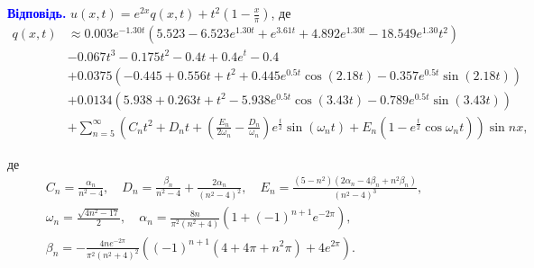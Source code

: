 \documentclass{hw_template}
\begin{document}
\textcolor{blue}{\textbf{Відповідь.}} $u(x,t) = e^{2x}q(x,t) + t^2\left(1-\frac{x}{\pi}\right)$, де
\begin{align*}
    q(x,t) &\approx 0.003e^{-1.30t}(5.523 - 6.523e^{1.30t} + e^{3.61t} + 4.892e^{1.30t} - 18.549e^{1.30}t^2) \\
    & -0.067t^3 - 0.175t^2 - 0.4t + 0.4e^t - 0.4 \\
    & +0.0375(-0.445 + 0.556t + t^2 + 0.445e^{0.5t}\cos(2.18t) - 0.357e^{0.5t}\sin(2.18t)) \\
    & +0.0134(5.938 + 0.263t + t^2 - 5.938e^{0.5t}\cos(3.43t) - 0.789e^{0.5t}\sin(3.43t)) \\
    & + \sum_{n=5}^{\infty} \left(C_nt^2 + D_nt + \left(\frac{E_n}{2\omega_n} - \frac{D_n}{\omega_n}\right)e^{\frac{t}{2}}\sin\left(\omega_n t\right) + E_n(1-e^{\frac{t}{2}}\cos \omega_n t)\right)\sin nx,
\end{align*}

де
\begin{gather*}
    C_n = \frac{\alpha_n}{n^2-4}, \quad D_n = \frac{\beta_n}{n^2-4} + \frac{2\alpha_n}{(n^2-4)^2}, \quad E_n = \frac{(5-n^2)(2\alpha_n-4\beta_n+n^2\beta_n)}{(n^2-4)^3}, \\
    \omega_n = \frac{\sqrt{4n^2-17}}{2}, \quad \alpha_n = \frac{8n}{\pi^2(n^2+4)}(1 + (-1)^{n+1}e^{-2\pi}), \\
    \beta_n = -\frac{4ne^{-2\pi}}{\pi^2(n^2+4)^2}((-1)^{n+1}(4+4\pi+n^2\pi) + 4e^{2\pi}).
\end{gather*}
\end{document}
